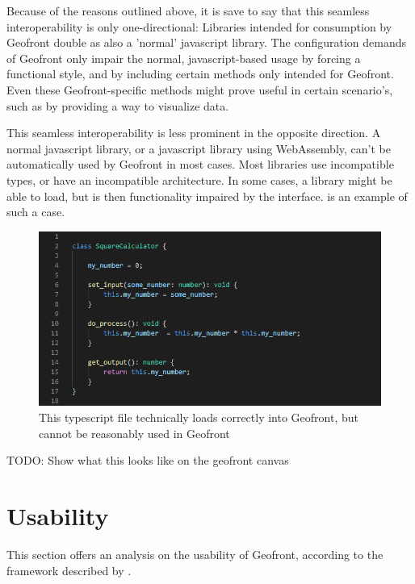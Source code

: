 Because of the reasons outlined above, it is save to say that this seamless interoperability is only one-directional: Libraries intended for consumption by Geofront double as also a 'normal' javascript library. 
The configuration demands of Geofront only impair the normal, javascript-based usage by forcing a functional style, and by including certain methods only intended for Geofront. 
Even these Geofront-specific methods might prove useful in certain scenario's, such as by providing a way to visualize data.

This seamless interoperability is less prominent in the opposite direction. 
A normal javascript library, or a javascript library using WebAssembly, can't be automatically used by Geofront in most cases. 
Most libraries use incompatible types, or have an incompatible architecture.
In some cases, a library might be able to load, but is then functionality impaired by the interface. 
 is an example of such a case.

\begin{figure}
  \centering
  \graphicspath{ {../../assets/images/6/3/} }
  \includegraphics[width=\linewidth]{ugly-oop.png}
  \caption[]{This typescript file technically loads correctly into Geofront, but cannot be reasonably used in Geofront}
  \label{fig:oop-considered-harmful}
\end{figure}

\begin{note}
  TODO: Show what this looks like on the geofront canvas
\end{note}

\section{Usability}
\label{sec:analyses:utilization}

This section offers an analysis on the usability of Geofront, according to the framework described by \cite[]{green_usability_1996}.

